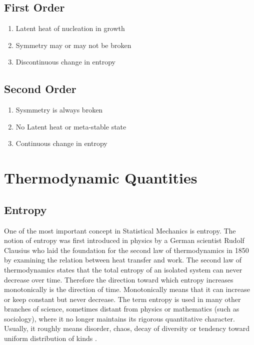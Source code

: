 	\subsection{First Order}
		\begin{enumerate}
			\item Latent heat of nucleation in growth
			\item Symmetry may or may not be broken
			\item Discontinuous change in entropy
		\end{enumerate}
	\subsection{Second Order}
		\begin{enumerate}
			\item Sysmmetry is always broken
			\item No Latent heat or meta-stable state
			\item Continuous change in entropy
		\end{enumerate}
	
\section{Thermodynamic Quantities}
	\subsection{Entropy}
	\label{subsect:entropy-thermodynamics}
	One of the most important concept in Statistical Mechanics is entropy. The notion of entropy was first introduced in physics by a German scientist Rudolf Clausius who laid the foundation for the second law of thermodynamics in 1850 by examining the relation between heat transfer and work.
	The second law of thermodynamics states that the total entropy of an isolated system can never decrease over time. Therefore the direction toward which entropy increases monotonically is the direction of time. Monotonically means that it can increase or keep constant but never decrease. 
	The term entropy	is used in many other branches of science, sometimes distant from physics or mathematics (such	as sociology), where it no longer maintains its rigorous quantitative character. Usually, it roughly	means disorder, chaos, decay of diversity or tendency toward uniform distribution of kinds \cite{Downarowicz2009}.
	
